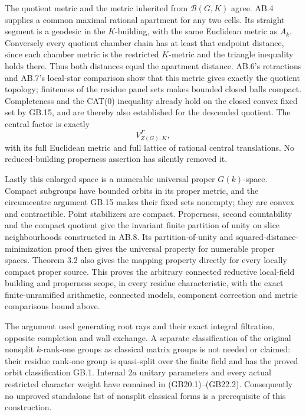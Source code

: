 \documentclass[
  11pt,
]{article}
\begin{document}
The quotient metric and the metric inherited from \(\mathcal B(G,K)\)
agree. AB.4 supplies a common maximal rational apartment for any two
cells. Its straight segment is a geodesic in the \(K\)-building, with
the same Euclidean metric as \(A_k\). Conversely every quotient chamber
chain has at least that endpoint distance, since each chamber metric is
the restricted \(K\)-metric and the triangle inequality holds there.
Thus both distances equal the apartment distance. AB.6's retractions and
AB.7's local-star comparison show that this metric gives exactly the
quotient topology; finiteness of the residue panel sets makes bounded
closed balls compact. Completeness and the CAT(0) inequality already
hold on the closed convex fixed set by GB.15, and are thereby also
established for the descended quotient. The central factor is exactly \[
                             V_{Z(G),K}^\Gamma ,
\] with its full Euclidean metric and full lattice of rational central
translations. No reduced-building properness assertion has silently
removed it.

Lastly this enlarged space is a numerable universal proper
\(G(k)\)-space. Compact subgroups have bounded orbits in its proper
metric, and the circumcentre argument GB.15 makes their fixed sets
nonempty; they are convex and contractible. Point stabilizers are
compact. Properness, second countability and the compact quotient give
the invariant finite partition of unity on slice neighbourhoods
constructed in AB.8. Its partition-of-unity and
squared-distance-minimization proof then gives the universal property
for numerable proper spaces. Theorem 3.2 also gives the mapping property
directly for every locally compact proper source. This proves the
arbitrary connected reductive local-field building and properness scope,
in every residue characteristic, with the exact finite-unramified
arithmetic, connected models, component correction and metric
comparisons bound above.

The argument used generating root rays and their exact integral
filtration, opposite completion and wall exchange. A separate
classification of the original nonsplit \(k\)-rank-one groups as
classical matrix groups is not needed or claimed: their residue rank-one
group is quasi-split over the finite field and has the proved orbit
classification GB.1. Internal \(2a\) unitary parameters and every actual
restricted character weight have remained in (GB20.1)--(GB22.2).
Consequently no unproved standalone list of nonsplit classical forms is
a prerequisite of this construction.
\end{document}
